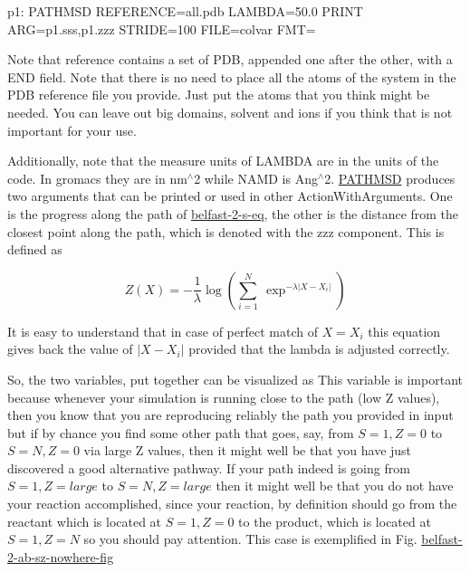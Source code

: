 \begin{DoxyVerb}p1: PATHMSD REFERENCE=all.pdb LAMBDA=50.0
PRINT ARG=p1.sss,p1.zzz STRIDE=100 FILE=colvar FMT=%
\end{DoxyVerb}


Note that reference contains a set of P\+D\+B, appended one after the other, with a E\+N\+D field. Note that there is no need to place all the atoms of the system in the P\+D\+B reference file you provide. Just put the atoms that you think might be needed. You can leave out big domains, solvent and ions if you think that is not important for your use.

Additionally, note that the measure units of L\+A\+M\+B\+D\+A are in the units of the code. In gromacs they are in nm$^\wedge$2 while N\+A\+M\+D is Ang$^\wedge$2. \hyperlink{PATHMSD}{P\+A\+T\+H\+M\+S\+D} produces two arguments that can be printed or used in other Action\+With\+Arguments. One is the progress along the path of \hyperlink{belfast-2_belfast-2-s-eq}{belfast-\/2-\/s-\/eq}, the other is the distance from the closest point along the path, which is denoted with the zzz component. This is defined as

\label{belfast-2_belfast-2-s-eq}%
\hypertarget{belfast-2_belfast-2-s-eq}{}%
 \[ Z(X)=-\frac{1}{\lambda}\log (\sum_{i=1}^{N} \ \exp^{-\lambda \vert X-X_i \vert }) \]

It is easy to understand that in case of perfect match of $ X=X_i $ this equation gives back the value of $ \vert X-X_i \vert $ provided that the lambda is adjusted correctly.

So, the two variables, put together can be visualized as \label{belfast-2_belfast-2-ab-sz-fig}%
\hypertarget{belfast-2_belfast-2-ab-sz-fig}{}%
 This variable is important because whenever your simulation is running close to the path (low Z values), then you know that you are reproducing reliably the path you provided in input but if by chance you find some other path that goes, say, from $ S=1, Z=0 $ to $ S=N, Z=0 $ via large Z values, then it might well be that you have just discovered a good alternative pathway. If your path indeed is going from $ S=1, Z=large $ to $ S=N, Z=large $ then it might well be that you do not have your reaction accomplished, since your reaction, by definition should go from the reactant which is located at $ S=1, Z=0 $ to the product, which is located at $ S=1, Z=N $ so you should pay attention. This case is exemplified in Fig. \hyperlink{belfast-2_belfast-2-ab-sz-nowhere-fig}{belfast-\/2-\/ab-\/sz-\/nowhere-\/fig}

